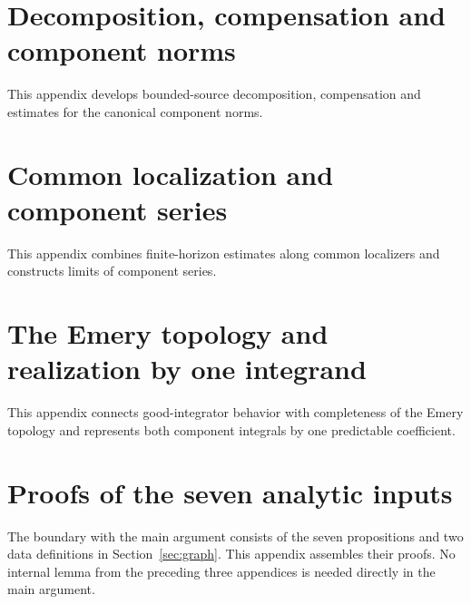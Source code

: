 \clearpage
\section{Decomposition, compensation and component norms}
\label{sec:construction}
This appendix develops bounded-source decomposition, compensation and estimates for the canonical component norms.









\clearpage
\section{Common localization and component series}
\label{sec:localization}
This appendix combines finite-horizon estimates along common localizers and constructs limits of component series.



\clearpage
\section{The Emery topology and realization by one integrand}
\label{sec:emery-realization}
This appendix connects good-integrator behavior with completeness of the Emery topology and represents both component integrals by one predictable coefficient.



\clearpage
\section{Proofs of the seven analytic inputs}
\label{sec:input-proofs}
The boundary with the main argument consists of the seven propositions and two data definitions in Section~\ref{sec:graph}. This appendix assembles their proofs. No internal lemma from the preceding three appendices is needed directly in the main argument.










